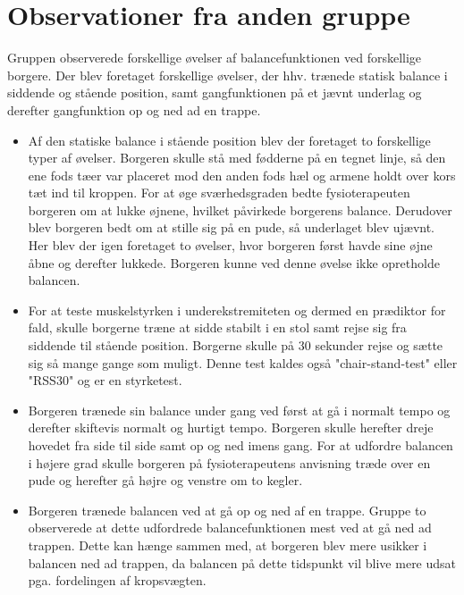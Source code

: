 \section{Observationer fra anden gruppe}
Gruppen observerede forskellige øvelser af balancefunktionen ved forskellige borgere. Der blev foretaget forskellige øvelser, der hhv. trænede statisk balance i siddende og stående position, samt gangfunktionen på et jævnt underlag og derefter gangfunktion op og ned ad en trappe. 
\begin{itemize}
\item Af den statiske balance i stående position blev der foretaget to forskellige typer af øvelser. Borgeren skulle stå med fødderne på en tegnet linje, så den ene fods tæer var placeret mod den anden fods hæl og armene holdt over kors tæt ind til kroppen. For at øge sværhedsgraden bedte fysioterapeuten borgeren om at lukke øjnene, hvilket påvirkede borgerens balance. Derudover blev borgeren bedt om at stille sig på en pude, så underlaget blev ujævnt. Her blev der igen foretaget to øvelser, hvor borgeren først havde sine øjne åbne og derefter lukkede. Borgeren kunne ved denne øvelse ikke opretholde balancen. 
\item For at teste muskelstyrken i underekstremiteten og dermed en prædiktor for fald, skulle borgerne træne at sidde stabilt i en stol samt rejse sig fra siddende til stående position. Borgerne skulle på $30$ sekunder rejse og sætte sig så mange gange som muligt. Denne test kaldes også "chair-stand-test" eller "RSS30" og er en styrketest. 
\item Borgeren trænede sin balance under gang ved først at gå i normalt tempo og derefter skiftevis normalt og hurtigt tempo. Borgeren skulle herefter dreje hovedet fra side til side samt op og ned imens gang. For at udfordre balancen i højere grad skulle borgeren på fysioterapeutens anvisning træde over en pude og herefter gå højre og venstre om to kegler.
\item Borgeren trænede balancen ved at gå op og ned af en trappe. Gruppe to observerede at dette udfordrede balancefunktionen mest ved at gå ned ad trappen. Dette kan hænge sammen med, at borgeren blev mere usikker i balancen ned ad trappen, da balancen på dette tidspunkt vil blive mere udsat pga. fordelingen af kropsvægten. 
\end{itemize} 